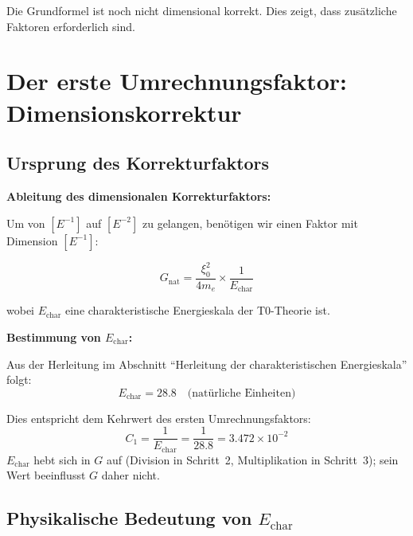 	Die Grundformel ist noch nicht dimensional korrekt. Dies zeigt, dass zusätzliche Faktoren erforderlich sind.
	
	\section{Der erste Umrechnungsfaktor: Dimensionskorrektur}
	
	\subsection{Ursprung des Korrekturfaktors}
	
	\begin{derivation}
		\textbf{Ableitung des dimensionalen Korrekturfaktors:}
		
		Um von $[E^{-1}]$ auf $[E^{-2}]$ zu gelangen, benötigen wir einen Faktor mit Dimension $[E^{-1}]$:
		
		\begin{equation}
			G_{\text{nat}} = \frac{\xi_0^2}{4 m_e} \times \frac{1}{E_{\text{char}}}
		\end{equation}
		
		wobei $E_{\text{char}}$ eine charakteristische Energieskala der T0-Theorie ist.
		
		\textbf{Bestimmung von $E_{\text{char}}$:}
		
		Aus der Herleitung im Abschnitt \enquote{Herleitung der charakteristischen Energieskala} folgt:
		\begin{equation}
			E_{\text{char}} = 28.8 \quad \text{(natürliche Einheiten)}
		\end{equation}
		
		Dies entspricht dem Kehrwert des ersten Umrechnungsfaktors:
		\begin{equation}
			C_1 = \frac{1}{E_{\text{char}}} = \frac{1}{28.8} = 3.472 \times 10^{-2}
		\end{equation}
		$E_{\text{char}}$ hebt sich in $G$ auf (Division in Schritt~2, Multiplikation in Schritt~3); sein Wert beeinflusst $G$ daher nicht.
	\end{derivation}
	
	\subsection{Physikalische Bedeutung von $E_{\text{char}}$}
	
